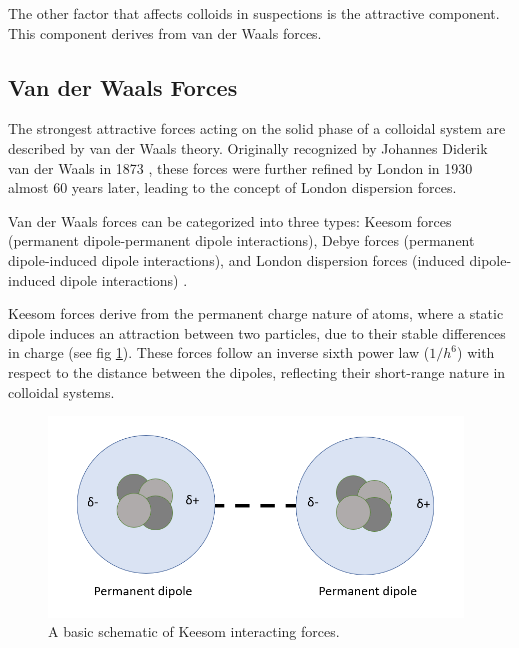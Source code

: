 The other factor that affects colloids in suspections is the attractive component. This component derives from van der Waals forces.





\subsection{Van der Waals Forces}


The strongest attractive forces acting on the solid phase of a colloidal system are described by van der Waals theory. Originally recognized by Johannes Diderik van der Waals in 1873 \cite{vanderWaals}, these forces were further refined by London in 1930 \cite{London} almost 60 years later, leading to the concept of London dispersion forces. 

Van der Waals forces can be categorized into three types: Keesom forces (permanent dipole-permanent dipole interactions), Debye forces (permanent dipole-induced dipole interactions), and London dispersion forces (induced dipole-induced dipole interactions) \cite{sciDirBook}. 

Keesom forces derive from the permanent charge nature of atoms, where a static dipole induces an attraction between two particles, due to their stable differences in charge (see fig \ref{fig:keesom}). These forces follow an inverse sixth power law (\(1/h^6\)) with respect to the distance between the dipoles, reflecting their short-range nature in colloidal systems.

\begin{figure}[h!!!!!!!!!!!!!!!!!!!!!!!!!]     %
        \begin{center}
          \includegraphics[width=110mm]{chapter1/keesom.PNG}
\end{center}
\caption{A basic schematic of Keesom interacting forces.}
\label{fig:keesom}                 %
\end{figure}

